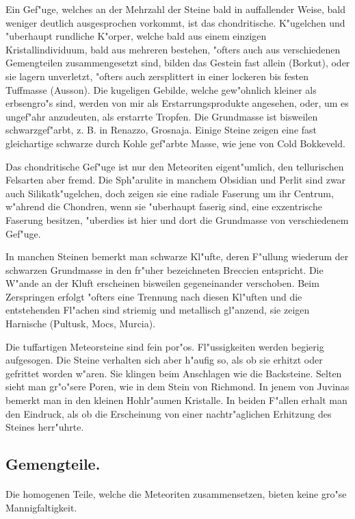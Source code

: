 \documentclass[a4paper, 11pt, oneside, polutonikogreek, german]{article}
\begin{document}
Ein Gef"uge, welches an der Mehrzahl der Steine bald in auffallender Weise, bald weniger deutlich ausgesprochen vorkommt, ist das chondritische. K"ugelchen und "uberhaupt rundliche K"orper, welche bald aus einem einzigen Kristallindividuum, bald aus mehreren bestehen, "ofters auch aus verschiedenen Gemengteilen zusammengesetzt sind, bilden das Gestein fast allein (Borkut), oder sie lagern unverletzt, "ofters auch zersplittert in einer lockeren bis festen Tuffmasse (Ausson). Die kugeligen Gebilde, welche gew"ohnlich kleiner als erbsengro"s sind, werden von mir als Erstarrungsprodukte angesehen, oder, um es ungef"ahr anzudeuten, als erstarrte Tropfen. Die Grundmasse ist bisweilen schwarzgef"arbt, z. B. in Renazzo, Grosnaja. Einige Steine zeigen eine fast gleichartige schwarze durch Kohle gef"arbte Masse, wie jene von Cold Bokkeveld.

Das chondritische Gef"uge ist nur den Meteoriten eigent"umlich, den tellurischen Felsarten aber fremd. Die Sph"arulite in manchem Obsidian und Perlit sind zwar auch Silikatk"ugelchen, doch zeigen sie eine radiale Faserung um ihr Centrum, w"ahrend die Chondren, wenn sie "uberhaupt faserig sind, eine exzentrische Faserung besitzen, "uberdies ist hier und dort die Grundmasse von verschiedenem Gef"uge.

In manchen Steinen bemerkt man schwarze Kl"ufte, deren F"ullung wiederum der schwarzen Grundmasse in den fr"uher bezeichneten Breccien entspricht. Die W"ande an der Kluft erscheinen bisweilen gegeneinander verschoben. Beim Zerspringen erfolgt "ofters eine Trennung nach diesen Kl"uften und die entstehenden Fl"achen sind striemig und metallisch gl"anzend, sie zeigen Harnische (Pultusk, Mocs, Murcia).

Die tuffartigen Meteorsteine sind fein por"os. Fl"ussigkeiten werden begierig aufgesogen. Die Steine verhalten sich aber h"aufig so, als ob sie erhitzt oder gefrittet worden w"aren. Sie klingen beim Anschlagen wie die Backsteine. Selten sieht man gr"o"sere Poren, wie in dem Stein von Richmond. In jenem von Juvinas bemerkt man in den kleinen Hohlr"aumen Kristalle. In beiden F"allen erhalt man den Eindruck, als ob die Erscheinung von einer nachtr"aglichen Erhitzung des Steines herr"uhrte.

\subsection{Gemengteile.}
\paragraph*{}
Die homogenen Teile, welche die Meteoriten zusammensetzen, bieten keine gro"se Mannigfaltigkeit.
\end{document}
